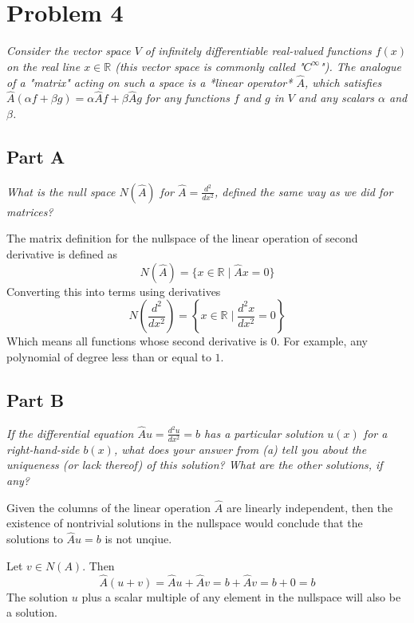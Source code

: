 \documentclass{article}
\begin{document}
\section*{Problem 4}

\textit{Consider the vector space $V$ of infinitely differentiable
real-valued functions $f(x)$ on the real line $x\in \mathbb{R}$ (this vector
space is commonly called "$C^\infty$"). The analogue of a "matrix" acting on
such a space is a *linear operator* $\hat{A}$, which satisfies
$\hat{A}(\alpha f + \beta g) = \alpha \hat{A} f + \beta \hat{A} g$ for any
functions $f$ and $g$ in $V$ and any scalars $\alpha$ and $\beta$.}

\subsection*{Part A}

\textit{What is the null space $N(\hat{A})$ for $\hat{A} = \frac{d^2}{dx^2}$,
defined the same way as we did for matrices?}

\bigbreak

The matrix definition for the nullspace of the linear operation of second
derivative is defined as
$$ N(\hat{A}) = \{ x \in \mathbb{R} \mid \hat{A}x = 0 \} $$
Converting this into terms using derivatives
$$ N\left(\frac{d^2}{dx^2}\right) = \left\{ x \in \mathbb{R} \mid \frac{d^2
x}{dx^2} = 0 \right\} $$
Which means all functions whose second derivative is $ 0 $. For example, any
polynomial of degree less than or equal to $ 1 $.

\subsection*{Part B}

\textit{If the differential equation $\hat{A} u = \frac{d^2 u}{dx^2} = b$ has
a particular solution $u(x)$ for a right-hand-side $b(x)$, what does your
answer from (a) tell you about the uniqueness (or lack thereof) of this
solution? What are the other solutions, if any?}

\bigbreak

Given the columns of the linear operation $ \hat{A} $ are linearly
independent, then the existence of nontrivial solutions in the nullspace
would conclude that the solutions to $ \hat{A} u = b $ is not unqiue.

Let $ v \in N(A) $. Then
$$ \hat{A}(u + v) = \hat{A} u + \hat{A} v = b + \hat{A} v = b + 0 = b $$
The solution $ u $ plus a scalar multiple of any element in the nullspace
will also be a solution.
\end{document}
